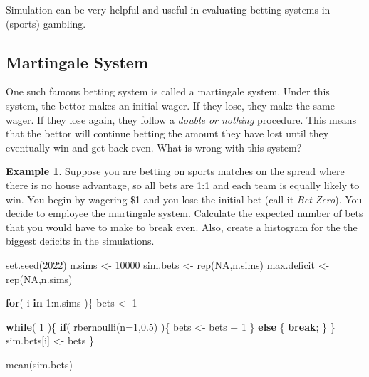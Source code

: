 \documentclass[
  11pt,
]{book}
\newenvironment{Shaded}{\begin{snugshade}}{\end{snugshade}}
\newcommand{\AttributeTok}[1]{\textcolor[rgb]{0.77,0.63,0.00}{#1}}
\newcommand{\ConstantTok}[1]{\textcolor[rgb]{0.00,0.00,0.00}{#1}}
\newcommand{\ControlFlowTok}[1]{\textcolor[rgb]{0.13,0.29,0.53}{\textbf{#1}}}
\newcommand{\DecValTok}[1]{\textcolor[rgb]{0.00,0.00,0.81}{#1}}
\newcommand{\FloatTok}[1]{\textcolor[rgb]{0.00,0.00,0.81}{#1}}
\newcommand{\FunctionTok}[1]{\textcolor[rgb]{0.00,0.00,0.00}{#1}}
\newcommand{\NormalTok}[1]{#1}
\newcommand{\OtherTok}[1]{\textcolor[rgb]{0.56,0.35,0.01}{#1}}
\newcommand{\SpecialCharTok}[1]{\textcolor[rgb]{0.00,0.00,0.00}{#1}}
\theoremstyle{definition}
\theoremstyle{definition}
\newtheorem{example}{Example}[chapter]
\theoremstyle{definition}
\theoremstyle{definition}
\theoremstyle{remark}
\begin{document}
Simulation can be very helpful and useful in evaluating betting systems in (sports) gambling.

\hypertarget{martingale-system}{%
\subsection{Martingale System}\label{martingale-system}}

One such famous betting system is called a martingale system. Under this system, the bettor makes an initial wager. If they lose, they make the same wager. If they lose again, they follow a \emph{double or nothing} procedure. This means that the bettor will continue betting the amount they have lost until they eventually win and get back even. What is wrong with this system?

\begin{example}
Suppose you are betting on sports matches on the spread where there is no house advantage, so all bets are 1:1 and each team is equally likely to win. You begin by wagering \$1 and you lose the initial bet (call it \emph{Bet Zero}). You decide to employee the martingale system. Calculate the expected number of bets that you would have to make to break even. Also, create a histogram for the the biggest deficits in the simulations.
\end{example}

\begin{Shaded}
\begin{Highlighting}[]
\FunctionTok{set.seed}\NormalTok{(}\DecValTok{2022}\NormalTok{)}
\NormalTok{n.sims }\OtherTok{\textless{}{-}} \DecValTok{10000}
\NormalTok{sim.bets }\OtherTok{\textless{}{-}} \FunctionTok{rep}\NormalTok{(}\ConstantTok{NA}\NormalTok{,n.sims)}
\NormalTok{max.deficit }\OtherTok{\textless{}{-}} \FunctionTok{rep}\NormalTok{(}\ConstantTok{NA}\NormalTok{,n.sims)}

\ControlFlowTok{for}\NormalTok{( i }\ControlFlowTok{in} \DecValTok{1}\SpecialCharTok{:}\NormalTok{n.sims )\{}
\NormalTok{  bets }\OtherTok{\textless{}{-}} \DecValTok{1}
  
  \ControlFlowTok{while}\NormalTok{( }\DecValTok{1}\NormalTok{ )\{}
    \ControlFlowTok{if}\NormalTok{( }\FunctionTok{rbernoulli}\NormalTok{(}\AttributeTok{n=}\DecValTok{1}\NormalTok{,}\FloatTok{0.5}\NormalTok{) )\{}
\NormalTok{      bets }\OtherTok{\textless{}{-}}\NormalTok{ bets }\SpecialCharTok{+} \DecValTok{1}
\NormalTok{    \} }\ControlFlowTok{else}\NormalTok{ \{}
      \ControlFlowTok{break}\NormalTok{;}
\NormalTok{    \}}
\NormalTok{  \}}
\NormalTok{  sim.bets[i] }\OtherTok{\textless{}{-}}\NormalTok{ bets}
\NormalTok{\}}

\FunctionTok{mean}\NormalTok{(sim.bets)}
\end{Highlighting}
\end{Shaded}
\end{document}
